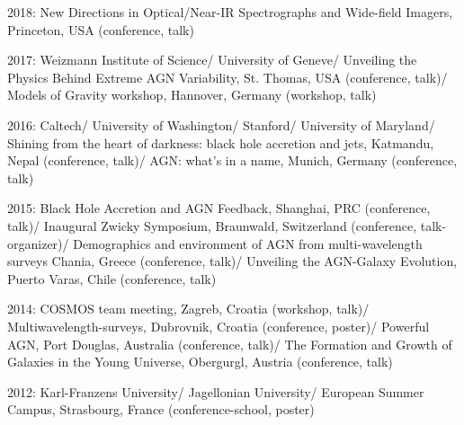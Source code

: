 \documentclass[11pt,letterpaper]{article}
\renewenvironment{itemize}{
  \begin{list}{}{
    \setlength{\leftmargin}{1.5em}
    \setlength{\itemsep}{0.15em}
    \setlength{\parskip}{0pt}
    \setlength{\parsep}{0.25em}
  }
}{
  \end{list}
}
\begin{document}
\begin{itemize}
\item 2018:  New Directions in Optical/Near-IR Spectrographs and Wide-field Imagers, Princeton, USA (conference, talk)

\item 2017:  Weizmann Institute of Science/ University of Geneve/ Unveiling the Physics Behind Extreme AGN Variability, St. Thomas, USA (conference, talk)/ Models of Gravity workshop, Hannover, Germany (workshop, talk)
\item 2016: Caltech/ University of Washington/ Stanford/ University of Maryland/ Shining from the heart of darkness: black hole accretion and jets, Katmandu, Nepal (conference, talk)/ AGN: what's in a name, Munich, Germany (conference, talk)
\item 2015:
Black Hole Accretion and AGN Feedback, Shanghai, PRC (conference, talk)/ Inaugural Zwicky Symposium, Braunwald, Switzerland (conference, talk-organizer)/ Demographics and environment of AGN from multi-wavelength surveys Chania, Greece (conference, talk)/ Unveiling the AGN-Galaxy Evolution, Puerto Varas, Chile (conference, talk)
\item 2014:
COSMOS team meeting, Zagreb, Croatia (workshop, talk)/ Multiwavelength-surveys, Dubrovnik, Croatia (conference, poster)/ Powerful AGN, Port Douglas, Australia (conference, talk)/ The Formation and
Growth of Galaxies in the Young Universe, Obergurgl, Austria (conference, talk)
\item 2012:
Karl-Franzens University/ Jagellonian University/
European Summer Campus, Strasbourg, France (conference-school, poster)
\end{itemize}



\end{document}
